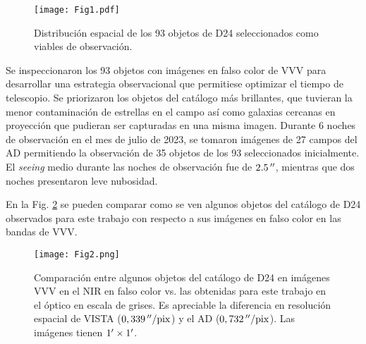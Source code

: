 \documentclass[baaa]{baaa}
\begin{document}
\begin{figure}
\centering
\texttt{[image: Fig1.pdf]}
\caption{Distribución espacial de los 93 objetos de D24 seleccionados como viables de observación.}
\label{targetobs}
\end{figure}

Se inspeccionaron los 93 objetos con imágenes en falso color de VVV para desarrollar una estrategia observacional que permitiese optimizar el tiempo de telescopio. Se priorizaron los objetos del catálogo más brillantes, que tuvieran la menor contaminación de estrellas en el campo así como galaxias cercanas en proyección que pudieran ser capturadas en una misma imagen. 
Durante 6 noches de observación en el mes de julio de 2023, se tomaron imágenes de 27 campos del AD permitiendo la observación de 35 objetos de los 93 seleccionados inicialmente. El \textit{seeing} medio durante las noches de observación fue de $2.5\,\hbox{$^{\prime\prime}$}$, mientras que dos noches presentaron leve nubosidad.

En la Fig. \ref{compgx} se pueden comparar como se ven algunos objetos del catálogo de D24 observados para este trabajo con respecto a sus imágenes en falso color en las bandas de VVV.

\begin{figure*}
\centering
\texttt{[image: Fig2.png]}
\caption{Comparación entre algunos objetos del catálogo de D24 en imágenes VVV en el NIR en falso color vs. las obtenidas para este trabajo en el óptico en escala de grises. Es apreciable la diferencia en resolución espacial de VISTA ($0,339\,\hbox{$^{\prime\prime}$}\mathrm{/pix}$) y el AD ($0,732\,\hbox{$^{\prime\prime}$}\mathrm{/pix}$). Las imágenes tienen $1\hbox{$^\prime$}\times1\hbox{$^\prime$}$.}
\label{compgx}
\end{figure*}
\end{document}
